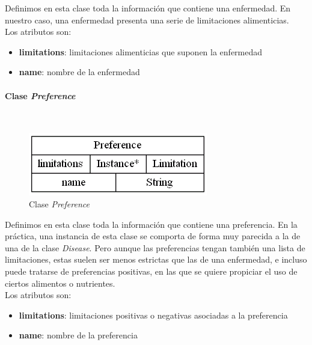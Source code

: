 \documentclass[11]{article}
\begin{document}
Definimos en esta clase toda la información que contiene una enfermedad. En nuestro caso, una enfermedad presenta una serie de limitaciones alimenticias.
\\

Los atributos son: 
\begin{itemize}
\item \textbf{limitations}: limitaciones alimenticias que suponen la enfermedad
\item \textbf{name}: nombre de la enfermedad
\end{itemize}

\vspace{0.5cm}

\paragraph{Clase \emph{Preference}}\mbox{}\\
\begin{figure}[H]
\centering
\includegraphics[scale=0.5]{images/class_Preference.png}
\caption{Clase \emph{Preference}}
\label{fig_class_Preference}
\end{figure}

Definimos en esta clase toda la información que contiene una preferencia. En la práctica, una instancia de esta clase se comporta de forma muy parecida a la de una de la clase \emph{Disease}. Pero aunque las preferencias tengan también una lista de limitaciones, estas suelen ser menos estrictas que las de una enfermedad, e incluso puede tratarse de preferencias positivas, en las que se quiere propiciar el uso de ciertos alimentos o nutrientes.
\\

Los atributos son: 
\begin{itemize}
\item \textbf{limitations}: limitaciones positivas o negativas asociadas a la preferencia
\item \textbf{name}: nombre de la preferencia
\end{itemize}

\vspace{0.5cm}
\end{document}
